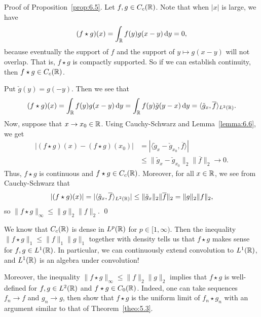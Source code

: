 {\sc Proof of Proposition~\ref{prop:6.5}.} Let $f, g \in C_c(\mathbb{R})$. 
Note that when $|x|$ is large, we have 
\[ (f \star g)(x) = \int_{\mathbb{R}} f(y) g(x-y)\,\mathrm{d} y = 0, \] 
because eventually the support of $f$ and the support of $y \mapsto g(x-y)$ 
will not overlap. That is, $f \star g$ is compactly supported. So if we 
can establish continuity, then $f \star g \in C_c(\mathbb{R})$. 

Put $\check g(y) = g(-y)$. Then we see that 
\[ (f \star g)(x) = \int_{\mathbb{R}} f(y) g(x-y)\,\mathrm{d} y = \int_{\mathbb{R}} 
f(y) \check g(y-x)\,\mathrm{d} y = \langle \check g_x, \overline f \rangle_{L^2(\mathbb{R})}. \] 
Now, suppose that $x \to x_0 \in \mathbb{R}$. Using Cauchy-Schwarz and 
Lemma~\ref{lemma:6.6}, we get 
\begin{align*}
    |(f \star g)(x) - (f \star g)(x_0)| 
    &= |\langle \check g_x - \check g_{x_0}, \overline f \rangle| \\
    &\leq \| \check g_x - \check g_{x_0} \|_2 \| \overline f \|_2 \to 0. 
\end{align*}
Thus, $f \star g$ is continuous and $f \star g \in C_c(\mathbb{R})$. 
Moreover, for all $x \in \mathbb{R}$, we see from Cauchy-Schwarz that
\[ |(f \star g)(x)| = |\langle \check g_x, \overline f \rangle_{L^2(\mathbb{R})}|
\leq \|\check g_x\|_2 \|\overline f\|_2 = \|g\|_2 \|f\|_2, \] 
so $\|f \star g\|_\infty \leq \|g\|_2 \|f\|_2$. \qed 

We know that $C_c(\mathbb{R})$ is dense in $L^p(\mathbb{R})$ for $p \in [1, \infty)$. 
Then the inequality $\|f \star g\|_1 \leq \|f\|_1 \|g\|_1$ together 
with density tells us that $f \star g$ makes sense for $f, g \in L^1(\mathbb{R})$. 
In particular, we can continuously extend convolution to $L^1(\mathbb{R})$, 
and $L^1(\mathbb{R})$ is an algebra under convolution!  

Moreover, the inequality $\|f \star g\|_\infty \leq \|f\|_2 \|g\|_2$ 
implies that $f \star g$ is well-defined for $f, g \in L^2(\mathbb{R})$ and 
$f \star g \in C_0(\mathbb{R})$. Indeed, one can take sequences $f_n \to f$ 
and $g_n \to g$, then show that $f \star g$ is the uniform limit of 
$f_n \star g_n$ with an argument similar to that of Theorem~\ref{theo:5.3}.

